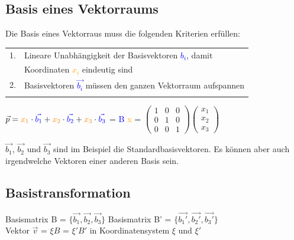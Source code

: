 	  	
		  	\subsection{Basis eines Vektorraums}
		  	Die Basis eines Vektorraus muss die folgenden Kriterien erfüllen: \\
		  	\begin{tabular}{ll}
		  	1. & Lineare Unabhängigkeit der Basisvektoren \textcolor{blue}{$b_i$}, damit \\  
		  	& Koordinaten \textcolor{orange}{$x_i$} eindeutig sind \\
		  	2. & Basisvektoren \textcolor{blue}{$\vec{b_i}$} müssen den ganzen Vektorraum aufspannen \\
		  	\\
		  	\end{tabular}
		  		
		  	$\vec{p} = \textcolor{orange}{x_1} \cdot \textcolor{blue}{\vec{b_1}} + \textcolor{orange}{x_2} \cdot \textcolor{blue}{\vec{b_2}} + \textcolor{orange}{x_3} \cdot \textcolor{blue}{\vec{b_3}}$  = \textcolor{blue}{B} \textcolor{orange}x = $\begin{pmatrix}
1 & 0 & 0 \\ 0 & 1 & 0 \\ 0 & 0 & 1 	\end{pmatrix} \begin{pmatrix}
x_1 \\ x_2 \\ x_3
\end{pmatrix}$ \\

\vspace{0.2cm}

$\vec{b_1}$, $\vec{b_2}$ und $\vec{b_3}$ sind im Beispiel die Standardbasisvektoren. Es können aber auch irgendwelche Vektoren einer anderen Basis sein.


		  	
			\subsection{Basistransformation}		  	
			Basismatrix B = $\lbrace \vec{b_1}, \vec{b_2}, \vec{b_3} \rbrace$ \qquad Basismatrix B' = $\lbrace \vec{b_1'}, \vec{b_2'}, \vec{b_3'} \rbrace$		\\
	
			Vektor $\vec{v}$ = $\xi B$ = $\xi' B'$ in Koordinatensystem $\xi$ und $\xi'$
 
